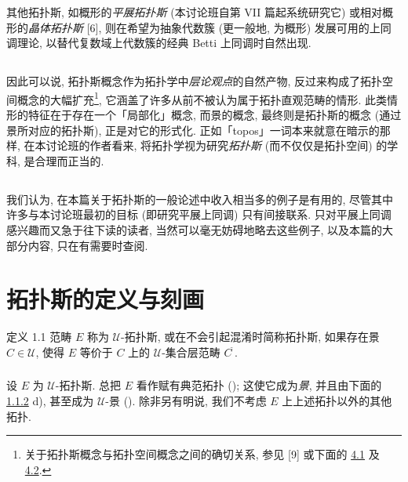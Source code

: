 其他拓扑斯, 如概形的\emph{平展拓扑斯} (本讨论班自第 VII 篇起系统研究它) 或相对概形的\emph{晶体拓扑斯} [6], 则在希望为抽象代数簇 (更一般地, 为概形) 发展可用的上同调理论, 以替代复数域上代数簇的经典 Betti 上同调时自然出现.

\subsection{}
因此可以说, 拓扑斯概念作为拓扑学中\emph{层论观点}的自然产物, 反过来构成了拓扑空间概念的大幅扩充\footnote[1]{关于拓扑斯概念与拓扑空间概念之间的确切关系, 参见 [9] 或下面的 \hyperref[IV.subsec4.1]{4.1} 及 \hyperref[IV.subsec4.2]{4.2}.}, 它涵盖了许多从前不被认为属于拓扑直观范畴的情形. 此类情形的特征在于存在一个「局部化」概念, 而景的概念, 最终则是拓扑斯的概念 (通过景所对应的拓扑斯), 正是对它的形式化. 正如「topos」一词本来就意在暗示的那样, 在本讨论班的作者看来, 将拓扑学视为研究\emph{拓扑斯} (而不仅仅是拓扑空间) 的学科, 是合理而正当的.

\subsection{}
我们认为, 在本篇关于拓扑斯的一般论述中收入相当多的例子是有用的, 尽管其中许多与本讨论班最初的目标 (即研究平展上同调) 只有间接\pageoriginale 联系. 只对平展上同调感兴趣而又急于往下读的读者, 当然可以毫无妨碍地略去这些例子, 以及本篇的大部分内容, 只在有需要时查阅.

\section{拓扑斯的定义与刻画}

\begin{enonce*}{定义 1.1}
范畴 $E$ 称为 $𝒰$-拓扑斯, 或在不会引起混淆时简称拓扑斯, 如果存在景 $C\in 𝒰$, 使得 $E$ 等价于 $C$ 上的 $𝒰$-集合层范畴 $C^{\widetilde{\phantom{,}}}$.
\end{enonce*}

\setcounter{subsection}{1}
\subsubsection{}
设 $E$ 为 $𝒰$-拓扑斯. 总把 $E$ 看作赋有典范拓扑 (); 这使它成为\emph{景}, 并且由下面的 \hyperref[IV.subsubsec1.1.2]{1.1.2} d), 甚至成为 $𝒰$-景 (). 除非另有明说, 我们不考虑 $E$ 上上述拓扑以外的其他拓扑.


